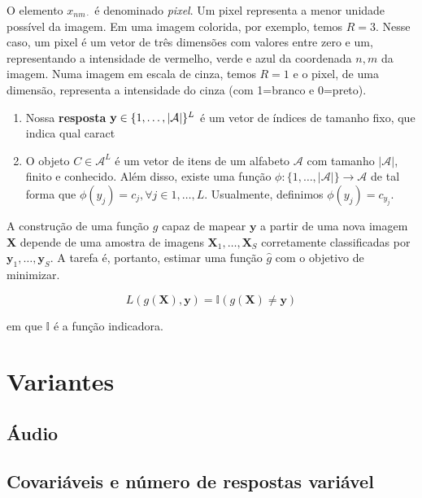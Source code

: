 \documentclass[12pt,]{report}
\begin{document}
O elemento \(x_{nm\cdot}\) é denominado \emph{pixel}. Um pixel
representa a menor unidade possível da imagem. Em uma imagem colorida,
por exemplo, temos \(R=3\). Nesse caso, um pixel é um vetor de três
dimensões com valores entre zero e um, representando a intensidade de
vermelho, verde e azul da coordenada \(n,m\) da imagem. Numa imagem em
escala de cinza, temos \(R=1\) e o pixel, de uma dimensão, representa a
intensidade do cinza (com 1=branco e 0=preto).

\begin{enumerate}
\def\labelenumi{\arabic{enumi}.}
\setcounter{enumi}{1}
\item
  Nossa \textbf{resposta}
  \(\mathbf y \in \mathbb \{1, \dots, |\mathcal A|\}^L\) é um vetor de
  índices de tamanho fixo, que indica qual caract
\item
  O objeto \(C \in \mathcal A^L\) é um vetor de itens de um alfabeto
  \(\mathcal A\) com tamanho \(|\mathcal A|\), finito e conhecido. Além
  disso, existe uma função
  \(\phi: \{1, \dots, |\mathcal A|\} \to \mathcal A\) de tal forma que
  \(\phi(y_j) = c_j, \forall j \in 1, \dots, L\). Usualmente, definimos
  \(\phi(y_j) = c_{y_j}\).
\end{enumerate}

A construção de uma função \(g\) capaz de mapear \(\mathbf y\) a partir
de uma nova imagem \(\mathbf X\) depende de uma amostra de imagens
\(\mathbf X_1, \dots, \mathbf X_S\) corretamente classificadas por
\(\mathbf y_1, \dots, \mathbf y_S\). A tarefa é, portanto, estimar uma
função \(\hat g\) com o objetivo de minimizar.

\[
L(g(\mathbf X), \mathbf y) = \mathbb I(g(\mathbf X) \neq \mathbf y)
\]

em que \(\mathbb I\) é a função indicadora.

\section{Variantes}\label{variantes}

\subsection{Áudio}\label{audio}

\subsection{Covariáveis e número de respostas
variável}\label{covariaveis-e-numero-de-respostas-variavel}
\end{document}
